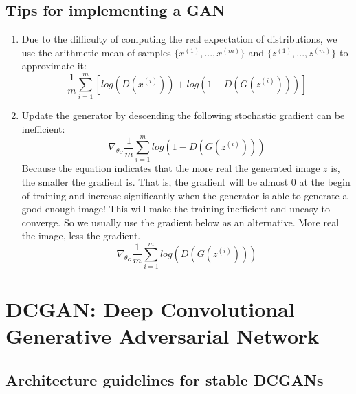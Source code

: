 \documentclass{article} %
\begin{document}
\subsection{Tips for implementing a GAN}

\begin{enumerate}
    \item Due to the difficulty of computing the real expectation of distributions, we use the arithmetic mean of samples $\{x^(1),...,x^{(m)}\}$ and $\{z^{(1)},...,z^{(m)}\}$ to approximate it:
        \begin{equation}
            \frac{1}{m}\sum_{i=1}^{m}[log(D(x^{(i)}))+log(1-D(G(z^{(i)})))]
        \end{equation}
    \item Update the generator by descending the following stochastic gradient can be inefficient:
        \begin{equation}
            \nabla_{\theta_{G}}\frac{1}{m}\sum_{i=1}^{m}log(1-D(G(z^{(i)})))
        \end{equation}
    Because the equation indicates that the more real the generated image $z$ is, the smaller the gradient is. That is, the gradient will be almost $0$ at the begin of training and increase significantly when the generator is able to generate a good enough image! This will make the training inefficient and uneasy to converge.
    So we usually use the gradient below as an alternative. More real the image, less the gradient.
        \begin{equation}
            \nabla_{\theta_{G}}\frac{1}{m}\sum_{i=1}^{m}log(D(G(z^{(i)})))
        \end{equation}
\end{enumerate}

\newpage

\section{DCGAN: Deep Convolutional Generative Adversarial Network}

\subsection{Architecture guidelines for stable DCGANs}
\end{document}
